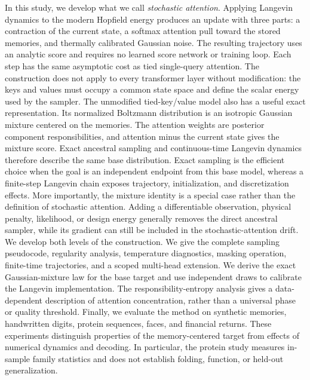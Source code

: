 In this study, we develop what we call \emph{stochastic attention}. Applying
Langevin dynamics to the modern Hopfield energy produces an update with three parts: a
contraction of the current state, a softmax attention pull toward the stored
memories, and thermally calibrated Gaussian noise. The resulting trajectory
uses an analytic score and requires no learned score network or training loop.
Each step has the same asymptotic cost as tied single-query attention. The
construction does not apply to every transformer layer without modification:
the keys and values must occupy a common state space and define the scalar
energy used by the sampler.
The unmodified tied-key/value model also has a useful exact representation. Its
normalized Boltzmann distribution is an isotropic Gaussian mixture centered on
the memories. The attention weights are posterior component responsibilities,
and attention minus the current state gives the mixture score. Exact ancestral
sampling and continuous-time Langevin dynamics therefore describe the same
base distribution. Exact sampling is the efficient choice when the goal is an
independent endpoint from this base model, whereas a finite-step Langevin chain
exposes trajectory, initialization, and discretization effects. More
importantly, the mixture identity is a special case rather than the definition
of stochastic attention. Adding a differentiable observation, physical
penalty, likelihood, or design energy generally removes the direct ancestral
sampler, while its gradient can still be included in the stochastic-attention
drift.
We develop both levels of the construction. We give the complete
sampling pseudocode, regularity analysis, temperature diagnostics, masking
operation, finite-time trajectories, and a scoped multi-head extension. We
derive the exact Gaussian-mixture law for the base target and use independent
draws to calibrate the Langevin implementation. The responsibility-entropy
analysis gives a data-dependent description of attention concentration, rather
than a universal phase or quality threshold. Finally, we evaluate the method on
synthetic memories, handwritten digits, protein sequences, faces, and
financial returns. These experiments distinguish properties of the
memory-centered target from effects of numerical dynamics and decoding. In
particular, the protein study measures in-sample family statistics and does not
establish folding, function, or held-out generalization.
